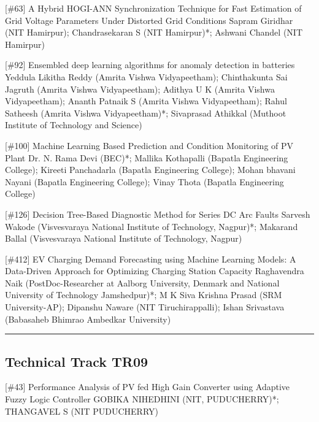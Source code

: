 {} \begin{abstract_online} {[\#63] A Hybrid HOGI-ANN Synchronization Technique for Fast Estimation of Grid Voltage Parameters Under Distorted Grid Conditions} {} {Sapram Giridhar (NIT Hamirpur); Chandrasekaran S (NIT Hamirpur)*; Ashwani Chandel (NIT Hamirpur)} {}  \end{abstract_online} 
{} \begin{abstract_online} {[\#92] Ensembled deep learning algorithms for anomaly detection in batteries} {} {Yeddula  Likitha Reddy (Amrita Vishwa Vidyapeetham); Chinthakunta Sai Jagruth (Amrita Vishwa Vidyapeetham); Adithya  U K (Amrita Vishwa Vidyapeetham); Ananth Patnaik S (Amrita Vishwa Vidyapeetham); Rahul  Satheesh (Amrita Vishwa Vidyapeetham)*; Sivaprasad Athikkal (Muthoot Institute of Technology and Science)} {}  \end{abstract_online} 
{} \begin{abstract_online} {[\#100] Machine Learning Based Prediction and Condition Monitoring of PV Plant} {} {Dr. N. Rama Devi   (BEC)*; Mallika Kothapalli (Bapatla Engineering College); Kireeti Panchadarla (Bapatla Engineering College); Mohan bhavani Nayani (Bapatla Engineering College); Vinay Thota (Bapatla Engineering College)} {}  \end{abstract_online} 
{} \begin{abstract_online} {[\#126] Decision Tree-Based Diagnostic Method for Series DC Arc Faults} {} {Sarvesh Wakode (Visvesvaraya National Institute of Technology, Nagpur)*; Makarand Ballal (Visvesvaraya National Institute of Technology, Nagpur)} {}  \end{abstract_online} 
{} \begin{abstract_online} {[\#412] EV Charging Demand Forecasting using Machine Learning Models: A Data-Driven Approach for Optimizing Charging Station Capacity} {} {Raghavendra Naik (PostDoc-Researcher at Aalborg University, Denmark and National University of Technology Jamshedpur)*; M K Siva Krishna  Prasad (SRM University-AP); Dipanshu  Naware (NIT Tiruchirappalli); Ishan  Srivastava (Babasaheb Bhimrao Ambedkar University)} {}  \end{abstract_online} 
\hrule  \subsection{Technical Track TR09}\nopagebreak {} \begin{abstract_online} {[\#43] Performance Analysis of PV fed High Gain Converter using Adaptive Fuzzy Logic Controller } {} {GOBIKA NIHEDHINI (NIT, PUDUCHERRY)*; THANGAVEL S (NIT PUDUCHERRY)} {}  \end{abstract_online} 
